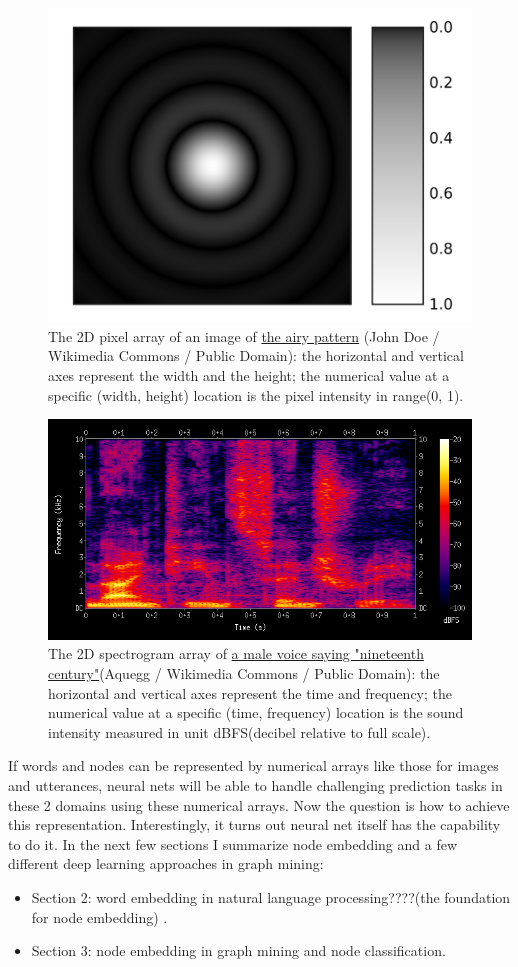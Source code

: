 \documentclass{article}
\begin{document}
\begin{figure}[h]
	\centering
	\includegraphics[width=0.5\linewidth]{Airy-pattern}
	\caption{The 2D pixel array of an image of  \href{https://commons.wikimedia.org/wiki/File:Airy-pattern.svg}{the airy pattern} (John Doe / Wikimedia Commons / Public Domain): the horizontal and vertical axes represent the width and the height; the numerical value at a specific (width, height) location is the pixel intensity in range(0, 1).}
	\label{fig:Airy-pattern}
\end{figure}

\begin{figure}[h]
	\includegraphics[width=\linewidth]{Spectrogram-19thC}
	\caption{The 2D spectrogram array of \href{https://commons.wikimedia.org/wiki/File:Spectrogram-19thC.png}{a male voice saying "nineteenth century"}(Aquegg / Wikimedia Commons / Public Domain): the horizontal and vertical axes represent the time and frequency; the numerical value at a specific (time, frequency) location is the sound intensity measured in unit dBFS(decibel relative to full scale).}
	\label{fig:Spectrogram-19thC}
\end{figure}

If words and nodes can be represented by numerical arrays like those for images and utterances, neural nets will be able to handle challenging prediction tasks in these 2 domains using these numerical arrays. Now the question is how to achieve this representation. Interestingly, it turns out neural net itself has the capability to do it. In the next few sections I summarize node embedding and a few different deep learning approaches in graph mining:
\begin{itemize}
	\item Section 2: word embedding in natural language processing????(the foundation for node embedding) .
	\item Section 3: node embedding in graph mining and node classification.
\end{itemize}
\end{document}
